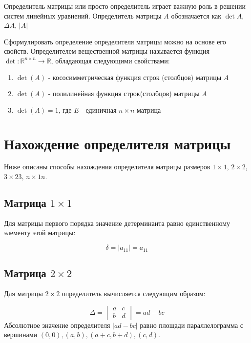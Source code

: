 \documentclass[a4paper,oneside,14pt]{extreport}
\begin{document}
	Определитель матрицы или просто определитель играет важную роль в решении систем линейных уравнений.
	Определитель матрицы $A$ обозначается как $\det A$, $\Delta A$, $|A|$
	
	Сформулировать определение определителя матрицы можно на основе его свойств.
	Определителем вещественной матрицы называется функция $\det{}: \mathbb{R}^{n\times n} \rightarrow \mathbb{R}$,
	обладающая следующими свойствами:
	
	\begin{enumerate}
		\item $\det{(A)}$ - кососимметрическая функция строк (столбцов) матрицы $A$
		\item $\det{(A)}$ - полилинейная функция строк(столбцов) матрицы $A$
		\item $\det{(A)} = 1$, где $E$ - единичная $n \times n$-матрица
	\end{enumerate}
	
\section{Нахождение определителя матрицы}
Ниже описаны способы нахождения определителя матрицы размеров $1 \times 1$, $2 \times 2$, $3 \times 23$, $n \times 1n$.

\subsection{Матрица $1 \times 1$}
Для матрицы первого порядка значение детерминанта равно единственному элементу этой матрицы:

\begin{equation}
\label{eq:det_1x1}
\delta  = |a_{11}| = a_{11}
\end{equation}

\subsection{Матрица $2 \times 2$}
Для матрицы $2 \times 2$ определитель вычисляется следующим образом:

\begin{equation}
\label{eq:det_2x2}
\Delta = \begin{vmatrix}
a & c \\
b & d
\end{vmatrix} = ad - bc
\end{equation}
Абсолютное значение определителя $|ad - bc|$ равно площади параллелограмма с вершинами
$(0, 0), (a, b), (a + c, b + d), (c, d)$.
\end{document}
